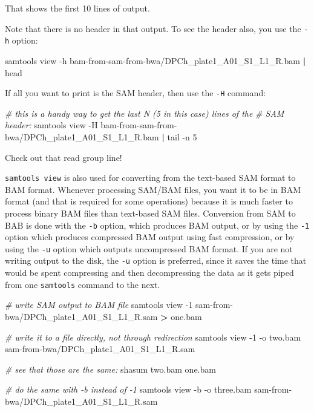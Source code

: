 \documentclass[]{krantz}
\makeatletter
\newenvironment{Shaded}{\begin{snugshade}}{\end{snugshade}}
\newcommand{\CommentTok}[1]{\textcolor[rgb]{0.37,0.37,0.37}{\textit{#1}}}
\newcommand{\ExtensionTok}[1]{#1}
\newcommand{\FunctionTok}[1]{\textcolor[rgb]{0,0,0}{#1}}
\newcommand{\KeywordTok}[1]{\textcolor[rgb]{0.27,0.27,0.27}{\textbf{#1}}}
\newcommand{\NormalTok}[1]{#1}
\newcommand{\OperatorTok}[1]{\textcolor[rgb]{0.43,0.43,0.43}{\textbf{#1}}}
\newenvironment{kframe}{%
\medskip{}
\setlength{\fboxsep}{.8em}
 \def\at@end@of@kframe{}%
 \ifinner\ifhmode%
  \def\at@end@of@kframe{\end{minipage}}%
  \begin{minipage}{\columnwidth}%
 \fi\fi%
 \def\FrameCommand##1{\hskip\@totalleftmargin \hskip-\fboxsep
 \colorbox{shadecolor}{##1}\hskip-\fboxsep
     \hskip-\linewidth \hskip-\@totalleftmargin \hskip\columnwidth}%
 \MakeFramed {\advance\hsize-\width
   \@totalleftmargin\z@ \linewidth\hsize
   \@setminipage}}%
 {\par\unskip\endMakeFramed%
 \at@end@of@kframe}
\renewenvironment{Shaded}{\begin{kframe}}{\end{kframe}}
\makeatother
\begin{document}
That shows the first 10 lines of output.

Note that there is no header in that output. To see the header also, you
use the \texttt{-h} option:

\begin{Shaded}
\begin{Highlighting}[]
\ExtensionTok{samtools}\NormalTok{ view -h bam-from-sam-from-bwa/DPCh_plate1_A01_S1_L1_R.bam }\KeywordTok{|} \FunctionTok{head}
\end{Highlighting}
\end{Shaded}

If all you want to print is the SAM header, then use the \texttt{-H} command:

\begin{Shaded}
\begin{Highlighting}[]
\CommentTok{# this is a handy way to get the last N (5 in this case) lines of the}
\CommentTok{# SAM header:}
\ExtensionTok{samtools}\NormalTok{ view -H bam-from-sam-from-bwa/DPCh_plate1_A01_S1_L1_R.bam }\KeywordTok{|} \FunctionTok{tail}\NormalTok{ -n 5}
\end{Highlighting}
\end{Shaded}

Check out that read group line!

\texttt{samtools\ view} is also used for converting from the text-based SAM format
to BAM format. Whenever processing SAM/BAM files, you want it to be in BAM format
(and that is required for some operations) because it is much faster to process
binary BAM files than text-based SAM files. Conversion from SAM to BAB is done with the \texttt{-b} option,
which produces BAM output, or by using the \texttt{-1} option which produces compressed
BAM output using fast compression, or by using the \texttt{-u} option which outputs
uncompressed BAM format. If you are not writing output to the disk, the
\texttt{-u} option is preferred, since it saves the time that would be spent compressing
and then decompressing the data as it gets piped from one \texttt{samtools} command
to the next.

\begin{Shaded}
\begin{Highlighting}[]
\CommentTok{# write SAM output to BAM file}
\ExtensionTok{samtools}\NormalTok{ view -1 sam-from-bwa/DPCh_plate1_A01_S1_L1_R.sam  }\OperatorTok{>}\NormalTok{ one.bam}

\CommentTok{# write it to a file directly, not through redirection}
\ExtensionTok{samtools}\NormalTok{ view -1 -o two.bam sam-from-bwa/DPCh_plate1_A01_S1_L1_R.sam}

\CommentTok{# see that those are the same:}
\ExtensionTok{shasum}\NormalTok{ two.bam one.bam}

\CommentTok{# do the same with -b instead of -1}
\ExtensionTok{samtools}\NormalTok{ view -b -o three.bam sam-from-bwa/DPCh_plate1_A01_S1_L1_R.sam}
\end{Highlighting}
\end{Shaded}
\end{document}
